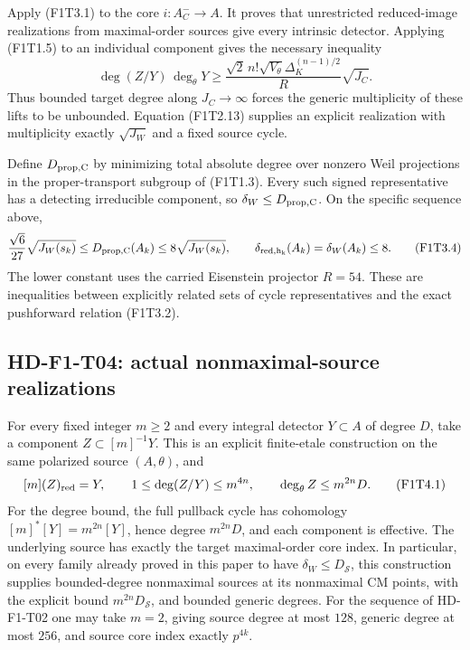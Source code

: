 Apply (F1T3.1) to the core $i:A_C^-\to A$. It proves that
unrestricted reduced-image realizations from maximal-order sources
give every intrinsic detector. Applying (F1T1.5) to an individual
component gives the necessary inequality
\[
 \deg(Z/Y)\,\deg_\theta Y\ge
  \frac{\sqrt2\,n!\sqrt{V_\theta}\Delta_K^{(n-1)/2}}{R}
       \sqrt{J_C}.                                        \tag{F1T3.3}
\]
Thus bounded target degree along $J_C\to\infty$ forces the generic
multiplicity of these lifts to be unbounded. Equation (F1T2.13)
supplies an explicit realization with multiplicity exactly
$\sqrt{J_W}$ and a fixed source cycle.

Define $D_{\rm prop,C}$ by minimizing total absolute degree over
nonzero Weil projections in the proper-transport subgroup of
(F1T1.3). Every such signed representative has a detecting
irreducible component, so $\delta_W\le D_{\rm prop,C}$.
On the specific sequence above,
\[
 \frac{\sqrt6}{27}\sqrt{J_W(s_k)}
    \le D_{\rm prop,C}(A_k)\le8\sqrt{J_W(s_k)},\qquad
 \delta_{\rm red,h_k}(A_k)=\delta_W(A_k)\le8.
 \tag{F1T3.4}
\]
The lower constant uses the carried Eisenstein projector $R=54$.
These are inequalities between explicitly related sets of cycle
representatives and the exact pushforward relation (F1T3.2).

\subsection{HD-F1-T04: actual nonmaximal-source realizations}

For every fixed integer $m\ge2$ and every integral detector
$Y\subset A$ of degree $D$, take a component
$Z\subset[m]^{-1}Y$. This is an explicit finite-etale construction
on the same polarized source $(A,\theta)$, and
\[
 [m](Z)_{\rm red}=Y,\qquad
 1\le\deg(Z/Y)\le m^{4n},\qquad
 \deg_\theta Z\le m^{2n}D.                                \tag{F1T4.1}
\]
For the degree bound, the full pullback cycle has cohomology
$[m]^*[Y]=m^{2n}[Y]$, hence degree $m^{2n}D$, and each component
is effective. The underlying source has exactly the target
maximal-order core index. In particular, on every family already
proved in this paper to have $\delta_W\le D_{\mathcal S}$, this
construction supplies bounded-degree nonmaximal sources at its
nonmaximal CM points, with the explicit bound
$m^{2n}D_{\mathcal S}$, and bounded generic degrees.
For the sequence of HD-F1-T02 one may take $m=2$, giving source
degree at most $128$, generic degree at most $256$, and source
core index exactly $p^{4k}$.

